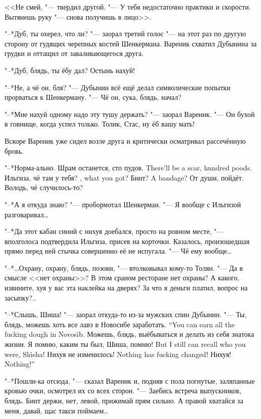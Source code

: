<<Не смей, "--- твердил другой.
"--- У тебя недостаточно практики и скорости.
Вытянешь руку "--- снова получишь в лицо>>.

"--*Дуб, ты охерел, что ли? "--- заорал третий голос "--- на этот раз по другую сторону от гудящих черепных костей Шенкермана.
Вареник схватил Дубынина за грудки и оттащил от заваливающегося друга.

"--*Дуб, блядь, ты ёбу дал?
Остынь нахуй!

"--*Не, а чё он, бля? "--- Дубынин всё ещё делал символические попытки прорваться к Шенкерману.
"--- Чё он, сука, блядь, начал?

"--*Мне нахуй одному надо эту тушу держать? "--- заорал Вареник.
"--- Он бухой в говнище, когда успел только.
Толик, Стас, ну ёб вашу мать!

Вскоре Вареник уже сидел возле друга и критически осматривал рассечённую бровь.

"--*Норма-ально.
{Шрам останется, сто пудов.}
{There'll be a scar, hundred poods.}
{Ильгиза, чё там у тебя?}
{\Ilgiza, what you got?}
{Бинт?}
{A bandage?}
От души, пойдёт.
Володь, чё случилось-то?

"--*А я откуда знаю? "--- пробормотал Шенкерман.
"--- Я вообще с Ильгизой разговаривал\ldots{}

"--*Да этот кабан синий с нихуя доебался, просто на ровном месте, "--- вполголоса подтвердила Ильгиза, присев на корточки.
Казалось, произошедшая прямо перед ней стычка совершенно её не испугала.
"--- Чё ему вообще\ldots{}

"--*\ldots{}Охрану, охрану, блядь, позови, "--- втолковывал кому-то Толян.
"--- Да в смысле <<нет охраны>>?
В этом сраном ресторане нет охраны?
А какого, извините, хуя у вас эта наклейка на дверях?
За что я деньги платил, вопрос на засыпку?..

"--*Слышь, Шиша! "--- заорал откуда-то из-за мужских спин Дубынин.
{"--- Ты, блядь, можешь хоть все лавэ в Новосибе заработать.}
{``You can earn all the fucking dough in Novos\'{\i}b.}
Можешь, блядь, выёбываться и делать из себя знатока жизни.
{Я помню, каким ты был, Шиша, помню!}
{But I still can recall who you were, Sh\'{\i}sha!}
{Нихуя не изменилось!}
{Nothing has fucking changed!}
{Нихуя!}
{Nothing!''}

"--*Пошли-ка отсюда, "--- сказал Вареник и, подняв с пола погнутые, заляпанные кровью очки, осмотрел их со всех сторон.
"--- Заебись встреча выпускников, блядь.
Бинт держи, нет, левой, прижимай прям сильно.
А правой хватайся за меня, давай, щас такси поймаем\ldots{}

